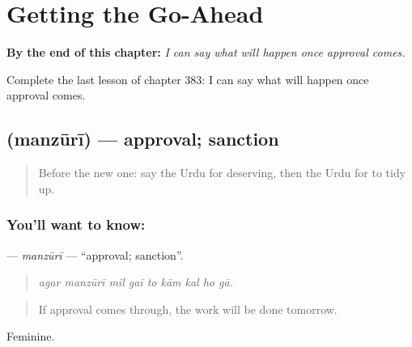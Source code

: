 
\chapter{Getting the Go-Ahead}
\label{ch:ur-getting-the-go-ahead}

\begin{chapteropening}
\textbf{By the end of this chapter:} \emph{I can say what will happen once approval comes.}

Complete the last lesson of chapter 383: I can say what will happen once approval comes.
\end{chapteropening}

\section[\texorpdfstring{\ur{منظوری} (manzūrī)}{منظوری (manzūrī)}]{ (manzūrī) — approval; sanction}

\label{lesson:UR-C383-manzuri}



\begin{quote}
Before the new one: say the Urdu for deserving, then the Urdu for to tidy up.
\end{quote}

\subsection*{You'll want to know: }
\textbf{} — \emph{manzūrī} — \textquotedblleft{}approval; sanction\textquotedblright{}.

\begin{quote}
        
\end{quote}

\begin{quote}
\emph{agar manzūrī mil gaī to kām kal ho gā.}
\end{quote}

\begin{quote}
If approval comes through, the work will be done tomorrow.
\end{quote}

Feminine.

